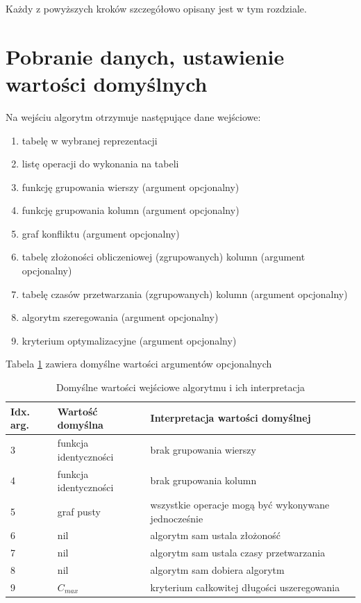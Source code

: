 \documentclass[brudnopis]{xmgr}
\begin{document}
Każdy z powyższych kroków szczegółowo opisany jest w tym rozdziale.

\newpage
\section{Pobranie danych, ustawienie wartości domyślnych}

Na wejściu algorytm otrzymuje następujące dane wejściowe:

\begin{enumerate}
    \item tabelę w wybranej reprezentacji
    \item listę operacji do wykonania na tabeli
    \item funkcję grupowania wierszy (argument opcjonalny)
    \item funkcję grupowania kolumn (argument opcjonalny)
    \item graf konfliktu (argument opcjonalny)
    \item tabelę złożoności obliczeniowej (zgrupowanych) kolumn (argument opcjonalny)
    \item tabelę czasów przetwarzania (zgrupowanych) kolumn (argument opcjonalny)
    \item algorytm szeregowania (argument opcjonalny)
    \item kryterium optymalizacyjne (argument opcjonalny)
\end{enumerate}


Tabela \ref{tab:args-default} zawiera domyślne wartości argumentów opcjonalnych 

\begin{table}[!tbh]
\begin{tabular}{|l|l|l|} \hline
Idx. arg. & Wartość domyślna & Interpretacja wartości domyślnej \\ \hline
3 & funkcja identyczności & brak grupowania wierszy \\ \hline
4 & funkcja identyczności & brak grupowania kolumn \\ \hline
5 & graf pusty & wszystkie operacje mogą być wykonywane jednocześnie \\ \hline
6 & nil & algorytm sam ustala złożoność \\ \hline
7 & nil & algorytm sam ustala czasy przetwarzania \\ \hline
8 & nil & algorytm sam dobiera algorytm \\ \hline
9 & $C_{max}$ & kryterium całkowitej długości uszeregowania \\ \hline
\end{tabular}
\caption{Domyślne wartości wejściowe algorytmu i ich interpretacja\label{tab:args-default}}
\end{table}
\end{document}
